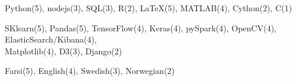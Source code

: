 
  \begin{cvitems}
    \vspace{.5\baselineskip}

   \item \small{Python(5), nodejs(3), SQL(3), R(2), \LaTeX(5), MATLAB(4), Cython(2), C(1)}
   \item \small{SKlearn(5), Pandas(5), TensorFlow(4), Keras(4), pySpark(4), OpenCV(4), ElasticSearch/Kibana(4),\\Matplotlib(4), D3(3), Django(2)}
   \item \small{Farsi(5), English(4), Swedish(3), Norwegian(2)}

  \end{cvitems}

